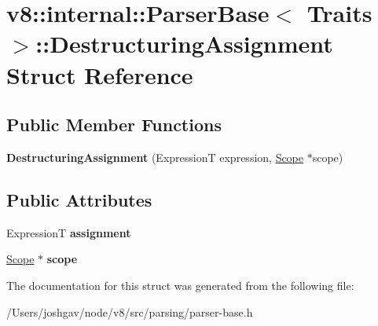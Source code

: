 \hypertarget{structv8_1_1internal_1_1_parser_base_1_1_destructuring_assignment}{}\section{v8\+:\+:internal\+:\+:Parser\+Base$<$ Traits $>$\+:\+:Destructuring\+Assignment Struct Reference}
\label{structv8_1_1internal_1_1_parser_base_1_1_destructuring_assignment}
\subsection*{Public Member Functions}
\begin{DoxyCompactItemize}
\item 
{\bfseries Destructuring\+Assignment} (ExpressionT expression, \hyperlink{classv8_1_1internal_1_1_scope}{Scope} $\ast$scope)\hypertarget{structv8_1_1internal_1_1_parser_base_1_1_destructuring_assignment_aa6b4e167db729c17f833994da7a911a7}{}\label{structv8_1_1internal_1_1_parser_base_1_1_destructuring_assignment_aa6b4e167db729c17f833994da7a911a7}

\end{DoxyCompactItemize}
\subsection*{Public Attributes}
\begin{DoxyCompactItemize}
\item 
ExpressionT {\bfseries assignment}\hypertarget{structv8_1_1internal_1_1_parser_base_1_1_destructuring_assignment_a410bb840f51b5d0321d22a720d4ac890}{}\label{structv8_1_1internal_1_1_parser_base_1_1_destructuring_assignment_a410bb840f51b5d0321d22a720d4ac890}

\item 
\hyperlink{classv8_1_1internal_1_1_scope}{Scope} $\ast$ {\bfseries scope}\hypertarget{structv8_1_1internal_1_1_parser_base_1_1_destructuring_assignment_ae4b5fdd86418d817f432b5c9b392e797}{}\label{structv8_1_1internal_1_1_parser_base_1_1_destructuring_assignment_ae4b5fdd86418d817f432b5c9b392e797}

\end{DoxyCompactItemize}


The documentation for this struct was generated from the following file\+:\begin{DoxyCompactItemize}
\item 
/\+Users/joshgav/node/v8/src/parsing/parser-\/base.\+h\end{DoxyCompactItemize}
